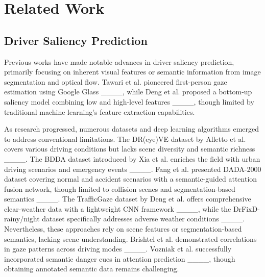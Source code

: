 \section{Related Work}
\subsection{Driver Saliency Prediction}
Previous works have made notable advances in driver saliency prediction, primarily focusing on inherent visual features or semantic information from image segmentation and optical flow. Tawari et al. pioneered first-person gaze estimation using Google Glass ____, while Deng et al. proposed a bottom-up saliency model combining low and high-level features ____, though limited by traditional machine learning's feature extraction capabilities.

As research progressed, numerous datasets and deep learning algorithms emerged to address conventional limitations. The DR(eye)VE dataset by Alletto et al. covers various driving conditions but lacks scene diversity and semantic richness ____. The BDDA dataset introduced by Xia et al. enriches the field with urban driving scenarios and emergency events ____. Fang et al. presented DADA-2000 dataset covering normal and accident scenarios with a semantic-guided attention fusion network, though limited to collision scenes and segmentation-based semantics ____. The TrafficGaze dataset by Deng et al. offers comprehensive clear-weather data with a lightweight CNN framework ____, while the DrFixD-rainy/night dataset specifically addresses adverse weather conditions ____. Nevertheless, these approaches rely on scene features or segmentation-based semantics, lacking scene understanding. Brishtel et al. demonstrated correlations in gaze patterns across driving modes ____. Vozniak et al. successfully incorporated semantic danger cues in attention prediction ____, though obtaining annotated semantic data remains challenging.

